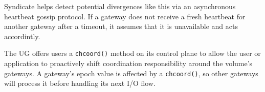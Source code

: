 Syndicate helps detect potential divergences like this via an asynchronous heartbeat
gossip protocol.  If a gateway does not receive a fresh heartbeat for another gateway after
a timeout, it assumes that it is unavailable and acts accordintly.

The UG offers users a
\texttt{chcoord()} method on its control plane to allow the user or application
to proactively shift coordination responsibility around the volume's
gateways.  A gateway's epoch value is affected by a \texttt{chcoord()}, so other
gateways will process it before handling its next I/O flow.

